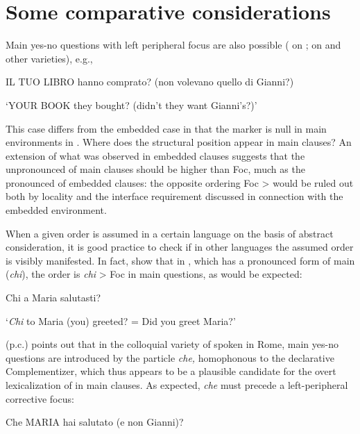 \documentclass[output=paper]{LSP/langsci}
\begin{document}
\section{Some comparative considerations}%

Main yes-no questions with left peripheral focus are also possible (\citealt{Holmberg2013,Holmberg2014finnishquestion} on ;  \citealt{BianchiCruschina2016} on  and other  varieties), e.g., 

\ea%
    \label{ex:rizzi:13}
  IL TUO LIBRO hanno comprato? (non volevano quello di Gianni?)

\glt ‘YOUR BOOK they bought? (didn’t they want Gianni’s?)’
\z

This case differs from the embedded  case in that the  marker is null in main environments in . Where does the structural position  appear in main clauses? An extension of what was observed in embedded clauses  suggests that the unpronounced  of main clauses  should be higher than Foc, much as the pronounced  of embedded clauses: the opposite ordering Foc >  would be ruled out both by locality and the interface requirement discussed in connection with the embedded environment. 

When a given order is assumed in a certain language on the basis of abstract consideration, it is good practice to check if in other languages the assumed order is visibly manifested. In fact,  \citet{BianchiCruschina2016} show that in , which has a pronounced form of main  (\textit{chi}), the order is \textit{chi} > Foc in main questions, as would be expected:

\ea%
    \label{ex:rizzi:14}
  Chi  a Maria salutasti?

 \glt ‘\textit{Chi}  to  Maria  (you) greeted? = Did you greet Maria?’
\z

\citeauthor{Belletti2004} (p.c.) points out that in the colloquial variety of  spoken in Rome, main yes-no questions are introduced by the particle \textit{che, }homophonous to the declarative Complementizer, which thus appears to be a plausible candidate for the overt lexicalization of  in main clauses. As expected, \textit{che} must precede a left-peripheral corrective focus:

\ea%
    \label{ex:rizzi:15}
\ea  Che MARIA hai salutato (e non Gianni)?
\end{document}
